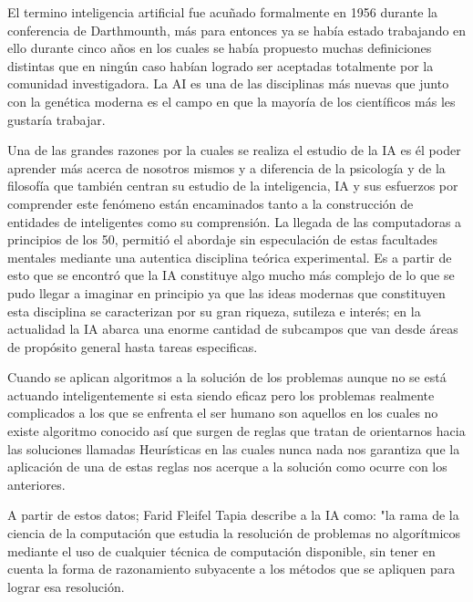\documentclass[11pt,a4paper]{article}
\begin{document}
\begin{multicols}{2}
El termino inteligencia artificial fue acuñado formalmente en 1956 durante la conferencia de Darthmounth, más para entonces ya se había estado trabajando en ello durante cinco años en los cuales se había propuesto muchas definiciones distintas que en ningún caso habían logrado ser aceptadas totalmente por la comunidad investigadora. La AI es una de las disciplinas más nuevas que junto con la genética moderna es el campo en que la mayoría de los científicos más les gustaría trabajar.

Una de las grandes razones por la cuales se realiza el estudio de la IA es él poder aprender más acerca de nosotros mismos y a diferencia de la psicología y de la filosofía que también centran su estudio de la inteligencia, IA y sus esfuerzos por comprender este fenómeno están encaminados tanto a la construcción de entidades de inteligentes como su comprensión.
La llegada de las computadoras a principios de los 50, permitió el abordaje sin especulación de estas facultades mentales mediante una autentica disciplina teórica experimental. Es a partir de esto que se encontró que la IA constituye algo mucho más complejo de lo que se pudo llegar a imaginar en principio ya que las ideas modernas que constituyen esta disciplina se caracterizan por su gran riqueza, sutileza e interés; en la actualidad la IA abarca una enorme cantidad de subcampos que van desde áreas de propósito general hasta tareas especificas.

Cuando se aplican algoritmos a la solución de los problemas aunque no se está actuando inteligentemente si esta siendo eficaz pero los problemas realmente complicados a los que se enfrenta el ser humano son aquellos en los cuales no existe algoritmo conocido así que surgen de reglas que tratan de orientarnos hacia las soluciones llamadas Heurísticas en las cuales nunca nada nos garantiza que la aplicación de una de estas reglas nos acerque a la solución como ocurre con los anteriores.

A partir de estos datos; Farid Fleifel Tapia describe a la IA como: "la rama de la ciencia de la computación que estudia la resolución de problemas no algorítmicos mediante el uso de cualquier técnica de computación disponible, sin tener en cuenta la forma de razonamiento subyacente a los métodos que se apliquen para lograr esa resolución.


\end{multicols}
\end{document}
